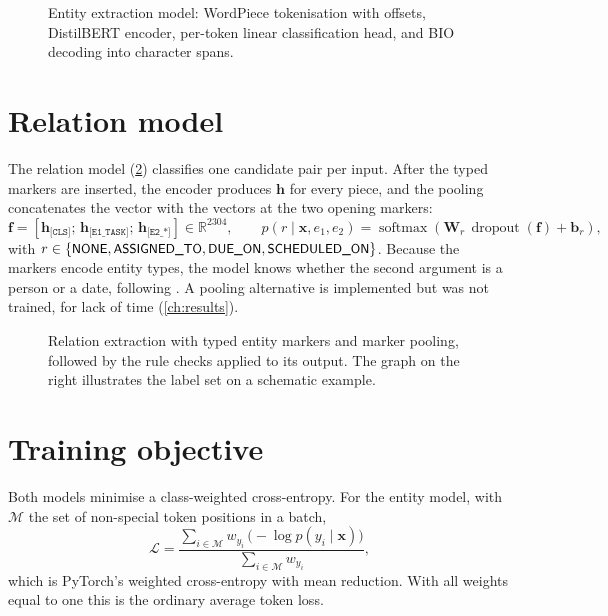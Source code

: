 \begin{figure}[t]
\centering
{}
\caption[Entity extraction model]{Entity extraction model: WordPiece tokenisation with offsets, DistilBERT encoder, per-token linear classification head, and BIO decoding into character spans.}
\label{fig:entitymodel}
\end{figure}

\section{Relation model}
The relation model (\cref{fig:relmodel}) classifies one candidate pair per input. After the typed markers are inserted, the encoder produces $\mathbf{h}$ for every piece, and the  pooling concatenates the \code{[CLS]} vector with the vectors at the two opening markers:
\begin{equation}
\mathbf{f} = \left[\mathbf{h}_{\texttt{[CLS]}};\, \mathbf{h}_{\texttt{[E1\_TASK]}};\, \mathbf{h}_{\texttt{[E2\_*]}}\right] \in \mathbb{R}^{2304}, \qquad
p(r \mid \mathbf{x}, e_1, e_2) = \operatorname{softmax}(\mathbf{W}_r\,\operatorname{dropout}(\mathbf{f}) + \mathbf{b}_r),
\end{equation}
with $r\in\{\lab{NONE},\lab{ASSIGNED\_TO},\lab{DUE\_ON},\lab{SCHEDULED\_ON}\}$. Because the markers encode entity types, the model knows whether the second argument is a person or a date, following \citet{zhong2021pure}. A  pooling alternative is implemented but was not trained, for lack of time (\cref{ch:results}).

\begin{figure}[t]
\centering
{}
\caption[Relation extraction architecture]{Relation extraction with typed entity markers and marker pooling, followed by the rule checks applied to its output. The graph on the right illustrates the label set on a schematic example.}
\label{fig:relmodel}
\end{figure}

\section{Training objective}
Both models minimise a class-weighted cross-entropy. For the entity model, with $\mathcal{M}$ the set of non-special token positions in a batch,
\begin{equation}
\mathcal{L} = \frac{\sum_{i\in\mathcal{M}} w_{y_i}\,\big(-\log p(y_i\mid\mathbf{x})\big)}{\sum_{i\in\mathcal{M}} w_{y_i}},
\end{equation}
which is PyTorch's weighted cross-entropy with mean reduction. With all weights equal to one this is the ordinary average token loss.


